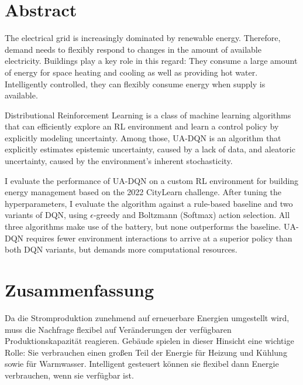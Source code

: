 \documentclass[oneside,12pt,a4paper]{report}
\begin{document}

\setcounter{page}{1}



\section*{Abstract}
The electrical grid is increasingly dominated by renewable energy.
Therefore, demand needs to flexibly respond to changes in the amount of available electricity.
Buildings play a key role in this regard:
They consume a large amount of energy for space heating and cooling as well as providing hot water.
Intelligently controlled, they can flexibly consume energy when supply is available.

Distributional Reinforcement Learning is a class of machine learning algorithms that can efficiently explore an RL environment and learn a control policy by explicitly modeling uncertainty.
Among those, UA-DQN is an algorithm that explicitly estimates epistemic uncertainty, caused by a lack of data, and aleatoric uncertainty, caused by the environment's inherent stochasticity.

I evaluate the performance of UA-DQN on a custom RL environment for building energy management based on the 2022 CityLearn challenge.
After tuning the hyperparameters, I evaluate the algorithm against a rule-based baseline and two variants of DQN, using $\epsilon$-greedy and Boltzmann (Softmax) action selection.
All three algorithms make use of the battery, but none outperforms the baseline.
UA-DQN requires fewer environment interactions to arrive at a superior policy than both DQN variants, but demands more computational resources.

\newpage
\section*{Zusammenfassung}
Da die Stromproduktion zunehmend auf erneuerbare Energien umgestellt wird, muss die Nachfrage flexibel auf Veränderungen der verfügbaren Produktionskapazität reagieren.
Gebäude spielen in dieser Hinsicht eine wichtige Rolle:
Sie verbrauchen einen großen Teil der Energie für Heizung und Kühlung sowie für Warmwasser.
Intelligent gesteuert können sie flexibel dann Energie verbrauchen, wenn sie verfügbar ist.
\end{document}
